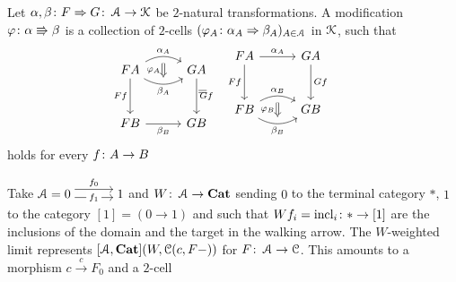 \documentclass[a4paper,11pt,oneside,openany]{scrbook}
\begin{document}
\begin{defn}
	Let $\alpha,\beta\colon F\Rightarrow G\colon\operatorname{\mathcal{A}}\to\operatorname{\mathcal{K}}$ be $2$-natural transformations. A modification $\varphi\colon\alpha\Rrightarrow\beta$ is a collection of $2$-cells $(\varphi_A\colon\alpha_A\Rightarrow\beta_A)_{A\in\operatorname{\mathcal{A}}}$ in $\operatorname{\mathcal{K}}$, such that
	\[
		\begin{minipage}{0.3\linewidth}
			\begin{tikzcd}[row sep=1cm, column sep=1cm]
				FA\arrow[d, "Ff"'] \arrow[r, bend right, "\beta_A"', ""{name=D, anchor=center}] \arrow[r, bend left,"\alpha_A", ""{name=U, anchor=center}] & GA \arrow[d, "Gf"] \\
				FB\arrow[r, "\beta_B"']            &GB
				\ar[Rightarrow, shorten <= .3em, shorten >= .3em, "\varphi_A"', from=U, to=D]
			\end{tikzcd}
		\end{minipage}
		\hspace{-1.3cm}
		=
		\hspace{.4cm}
		\begin{minipage}{0.3\linewidth}
			\begin{tikzcd}[row sep=1cm, column sep=1cm]
				FA\arrow[d,"Ff"'] \arrow[r, "\alpha_A"]                        &  GA\arrow[d,"Gf"] \\
				FB\arrow[r, bend right, "\beta_B"', ""{name=D, anchor=center}] \arrow[r, bend left,"\alpha_B", ""{name=U, anchor=center}] &    GB
				\ar[Rightarrow, shorten <= .3em, shorten >= .3em, "\varphi_B"', from=U, to=D]
			\end{tikzcd}
		\end{minipage}
	\]
	holds for every $f\colon A\to B$
\end{defn}
Take $\A=\hspace{-1.5mm}\begin{tikzcd}[row sep=1cm, column sep=1.3cm]
		0\hspace{-1.5mm}\arrow[r, "f_1" description,  shift right=.5ex, shorten <= .3em, shorten >= .3em]  \arrow[r, "f_0", shift left=1ex, shorten <= .3em, shorten >= .3em] & \hspace{-1.5mm}1
	\end{tikzcd}\hspace{-1.5mm}$ and $W\colon\operatorname{\mathcal{A}}\to{\normalfont\textbf{Cat}}$ sending $0$ to the terminal category $*$, $1$ to the category $[1]=(0\to 1)$ and such that $Wf_i=\text{incl}_i\colon *\to[1]$ are the inclusions of the domain and the target in the walking arrow. The $W$-weighted limit represents $[\operatorname{\mathcal{A}},{\normalfont\textbf{Cat}}](W,\operatorname{\mathcal{C}}(c,F-))$ for $F\colon\operatorname{\mathcal{A}}\to\operatorname{\mathcal{C}}$. This amounts to a morphism $c\xrightarrow{c}F_0$ and a $2$-cell
\end{document}
